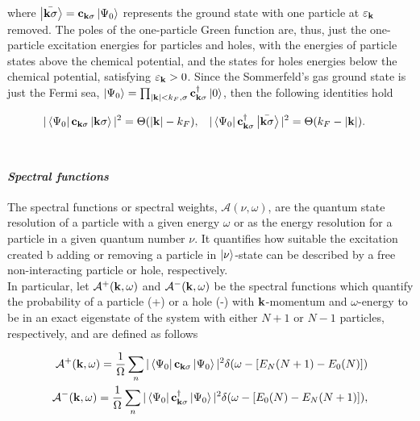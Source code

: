 where $\ket{\bar{{\bf k} \sigma}} = {{\bf c}}_{{\bf k} \sigma}\ket{\Psi_0}$ represents the ground state with one particle at $\varepsilon_{{\bf k}}$ removed. The poles of the one-particle Green function are, thus, just the one-particle excitation energies for particles and holes, with the energies of particle states above the chemical potential, and the states for holes energies below the chemical potential, satisfying $\varepsilon_{{\bf k}} > 0$. Since the Sommerfeld's gas ground state is just the Fermi sea, $\ket{\Psi_0} = \prod_{|{\bf k}| < k_F, \sigma} {\bf c}^\dagger_{{\bf k} \sigma} \ket{0}$, then the following identities hold 

\begin{align}
    |\bra{\Psi_0} {{\bf c}}_{{\bf k} \sigma} \ket{{\bf k} \sigma}|^2 &= \Theta(|{\bf k}| - k_F), & |\bra{\Psi_0} {{\bf c}}^\dagger_{{\bf k} \sigma} \ket{\bar{{\bf k} \sigma}}|^2 &= \Theta( k_F - |{\bf k}|). 
\end{align}\\

\paragraph{\textit{Spectral functions}}

The spectral functions or spectral weights, $\mathcal{A}(\nu, \omega)$, are the quantum state resolution of a particle with a given energy $\omega$ or as the energy resolution for a particle in a given quantum number $\nu$. It quantifies how suitable the excitation created b adding or removing a particle in $\ket{\nu}$-state can be described by a free non-interacting particle or hole, respectively. \\

In particular, let $\mathcal{A}^{+}({\bf k}, \omega)$ and $\mathcal{A}^{-}({\bf k}, \omega)$ be the spectral functions which quantify the probability of a particle (+) or a hole (-) with ${\bf k}$-momentum and $\omega$-energy to be in an exact eigenstate of the system with either $N+1$ or $N-1$ particles, respectively, and are defined as follows 

\begin{equation}
    \begin{split}
        \mathcal{A}^{+}({\bf k}, \omega) = \frac{1}{\Omega} \sum_{n} |\bra{\Psi_0} {{\bf c}}_{{\bf k} \sigma} \ket{\Psi_0}|^2 \delta(\omega - [E_N(N+1) - E_0(N)]) \\
        \mathcal{A}^{-}({\bf k}, \omega) = \frac{1}{\Omega} \sum_{n} |\bra{\Psi_0} {{\bf c}}_{{\bf k}\sigma}^\dagger \ket{\Psi_0}|^2 \delta(\omega - [E_0(N) - E_N(N+1)]),
    \end{split}
\end{equation}

